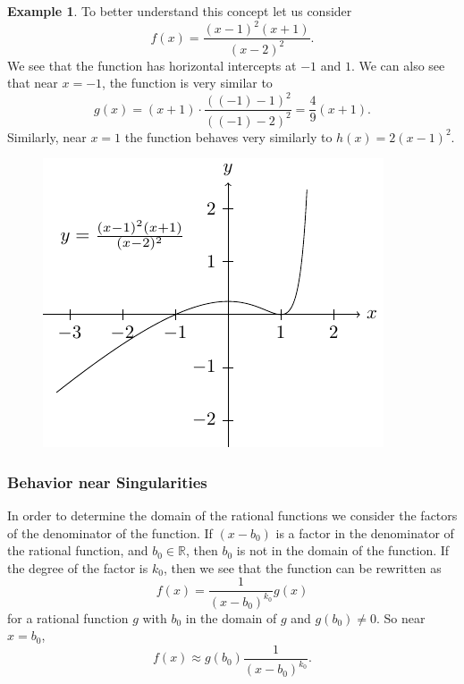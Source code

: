 \documentclass[
]{book}
\theoremstyle{definition}
\theoremstyle{definition}
\newtheorem{example}{Example}[chapter]
\theoremstyle{definition}
\theoremstyle{remark}
\begin{document}
\begin{example}
\protect\hypertarget{exm:unnamed-chunk-223}{}{\label{exm:unnamed-chunk-223} }To better understand this concept let us consider \[f(x)=\frac{(x-1)^2(x+1)}{(x-2)^2}.\]
We see that the function has horizontal intercepts at \(-1\) and \(1\). We can also see that near \(x=-1\), the function is very similar to \[g(x)= (x+1) \cdot \frac{ ((-1)-1)^2}{((-1)-2)^2}= \frac{4}{9} (x+1).\] Similarly, near \(x=1\) the function behaves very similarly to \(h(x)= 2(x-1)^2\).
\end{example}
\begin{figure}

{\centering \includegraphics[width=0.5\linewidth]{tikz/rational1} 

}

\end{figure}

\hypertarget{behavior-near-singularities}{%
\subsubsection{Behavior near Singularities}\label{behavior-near-singularities}}

In order to determine the domain of the rational functions we consider the factors of the denominator of the function. If \((x-b_0)\) is a factor in the denominator of the rational function, and \(b_0\in \mathbb{R}\), then \(b_0\) is not in the domain of the function. If the degree of the factor is \(k_0\), then we see that the function can be rewritten as \[f(x)= \frac{1}{(x-b_0)^{k_0}} g(x)\] for a rational function \(g\) with \(b_0\) in the domain of \(g\) and \(g(b_0)\neq 0\). So near \(x=b_0\), \[f(x) \approx g(b_0) \frac{1}{(x-b_0)^{k_0}}.\]
\end{document}
